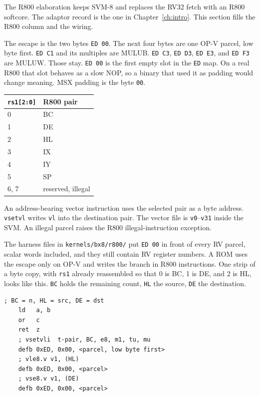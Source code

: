 The R800 elaboration keeps SVM-8 and replaces the RV32 fetch with an R800 softcore. The adaptor record is the one in Chapter~\ref{ch:intro}. This section fills the R800 column and the wiring.

The escape is the two bytes \texttt{ED 00}. The next four bytes are one OP-V parcel, low byte first. \texttt{ED C1} and its multiples are MULUB. \texttt{ED C3}, \texttt{ED D3}, \texttt{ED E3}, and \texttt{ED F3} are MULUW. Those stay. \texttt{ED 00} is the first empty slot in the \texttt{ED} map. On a real R800 that slot behaves as a slow NOP, so a binary that used it as padding would change meaning. MSX padding is the byte \texttt{00}.

\begin{center}
\small
\begin{tabular}{@{}ll@{}}
\toprule
\texttt{rs1[2:0]} & R800 pair \\
\midrule
0 & BC \\
1 & DE \\
2 & HL \\
3 & IX \\
4 & IY \\
5 & SP \\
6, 7 & reserved, illegal \\
\bottomrule
\end{tabular}
\end{center}

An address-bearing vector instruction uses the selected pair as a byte address. \texttt{vsetvl} writes \texttt{vl} into the destination pair. The vector file is \texttt{v0}--\texttt{v31} inside the SVM. An illegal parcel raises the R800 illegal-instruction exception.

The harness files in \texttt{kernels/bx8/r800/} put \texttt{ED 00} in front of every RV parcel, scalar words included, and they still contain RV register numbers. A ROM uses the escape only on OP-V and writes the branch in R800 instructions. One strip of a byte copy, with \texttt{rs1} already reassembled so that 0 is BC, 1 is DE, and 2 is HL, looks like this. \texttt{BC} holds the remaining count, \texttt{HL} the source, \texttt{DE} the destination.

\begin{lstlisting}
; BC = n, HL = src, DE = dst
    ld   a, b
    or   c
    ret  z
    ; vsetvli  t-pair, BC, e8, m1, tu, mu
    defb 0xED, 0x00, <parcel, low byte first>
    ; vle8.v v1, (HL)
    defb 0xED, 0x00, <parcel>
    ; vse8.v v1, (DE)
    defb 0xED, 0x00, <parcel>
\end{lstlisting}

